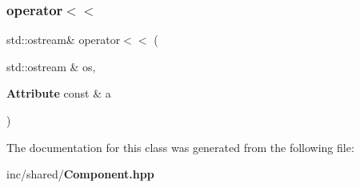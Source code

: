 \subsubsection{operator$<$$<$}
{\footnotesize\ttfamily std\+::ostream\& operator$<$$<$ (\begin{DoxyParamCaption}\item[{std\+::ostream \&}]{os,  }\item[{{\bf Attribute} const \&}]{a }\end{DoxyParamCaption})\hspace{0.3cm}{\ttfamily [friend]}}



The documentation for this class was generated from the following file\+:\begin{DoxyCompactItemize}
\item 
inc/shared/{\bf Component.\+hpp}\end{DoxyCompactItemize}
